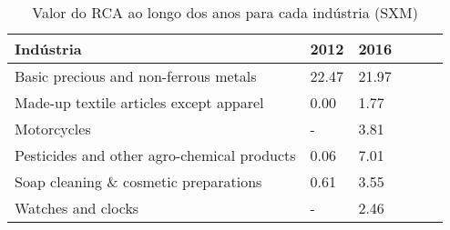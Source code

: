 \begin{table}
\centering
\caption{Valor do RCA ao longo dos anos para cada indústria (SXM)}
\label{tab:ex3-tempo-SXM}
\begin{tabular}{p{6cm}p{1.5cm}p{1.5cm}p{1.5cm}p{1.5cm}p{1.5cm}}
\toprule
                                  Indústria &  2012 &  2016 \\
\midrule
      Basic precious and non-ferrous metals & 22.47 & 21.97 \\
    Made-up textile articles except apparel &  0.00 &  1.77 \\
                                Motorcycles &     - &  3.81 \\
Pesticides and other agro-chemical products &  0.06 &  7.01 \\
      Soap cleaning \& cosmetic preparations &  0.61 &  3.55 \\
                         Watches and clocks &     - &  2.46 \\
\bottomrule
\end{tabular}
\end{table}
